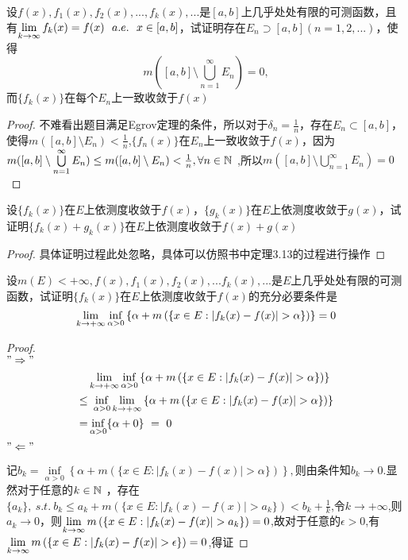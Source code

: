 设$f(x),f_1(x),f_2(x),...,f_k(x),...$是$[a,b]$上几乎处处有限的可测函数，且有$\lim\limits_{k\to\infty}f_k(x)=f(x)\ \ a.e.\ \ x\in [a,b]$，试证明存在$E_n\supset [a,b](n=1,2,...)$，使得$$m\left([a,b]\setminus \bigcup\limits_{n=1}^{\infty}E_n \right)=0,$$而$\{f_k(x)\}$在每个$E_n$上一致收敛于$f(x)$
\begin{proof}
	不难看出题目满足Egrov定理的条件，所以对于$\delta_n=\frac{1}{n}$，存在$E_n\subset[a,b]$，使得$m([a,b]\setminus E_n)<\frac{1}{n}$,$\{f_n(x)\}$在$E_n$上一致收敛于$f(x)$，因为$m([a,b]\setminus \bigcup\limits_{n=1}^{\infty}E_n)\leq m([a,b]\setminus E_n)<\frac{1}{n},\forall n \in \R{N}{\ }$,所以$m\left([a,b]\setminus \bigcup\limits_{n=1}^{\infty}E_n \right)=0$
\end{proof}


设$\{f_k(x)\}$在$E$上依测度收敛于$f(x)$，$\{g_k(x)\}$在$E$上依测度收敛于$g(x)$，试证明$\{f_k(x)+g_k(x)\}$在$E$上依测度收敛于$f(x)+g(x)$
\begin{proof}
	具体证明过程此处忽略，具体可以仿照书中定理3.13的过程进行操作
	
\end{proof}

设$m(E)<+\infty,f(x),f_1(x),f_2(x),...f_k(x),...$是$E$上几乎处处有限的可测函数，试证明$\{f_k(x)\}$在$E$上依测度收敛于$f(x)$的充分必要条件是$$\li{k\to+\infty}\inf\limits_{\alpha>0}\left\lbrace \alpha+m\left(\{x\in E:|f_k(x)-f(x)|>\alpha\} \right) \right\rbrace=0 $$
\begin{proof}
	\\$"\Rightarrow"$
	\[\begin{split}
	&\li{k\to+\infty}\inf\limits_{\alpha>0}\left\lbrace \alpha+m\left(\{x\in E:|f_k(x)-f(x)|>\alpha\} \right) \right\rbrace\\
	\leq&\ \inf\limits_{\alpha>0}\li{k\to+\infty}\left\lbrace \alpha+m\left(\{x\in E:|f_k(x)-f(x)|>\alpha\} \right) \right\rbrace\\
	=&	\inf\limits_{\alpha>0}\{\alpha+0\}\ =\ 0
	\end{split}\]
	$"\Leftarrow"$\par 
	记$b_k=\inf\limits_{\alpha>0}\left\lbrace \alpha+m\left(\{x\in E:|f_k(x)-f(x)|>\alpha\} \right) \right\rbrace,$则由条件知$b_k\to 0.$显然对于任意的$k\in\R{N}{\ }$，存在$\{a_k\},\ s.t.\ b_k\leq a_k+m\left(\{x\in E:|f_k(x)-f(x)|>a_k\} \right)< b_k+\displaystyle{\frac{1}{k}}$,令$k\to +\infty$,则$a_k\to 0$，则$\li{k\to\infty}m\left(\{x\in E:|f_k(x)-f(x)|>a_k\} \right)=0$,故对于任意的$\epsilon>0$,有$\li{k\to\infty}m\left(\{x\in E:|f_k(x)-f(x)|>\epsilon\} \right)=0$,得证
\end{proof}



